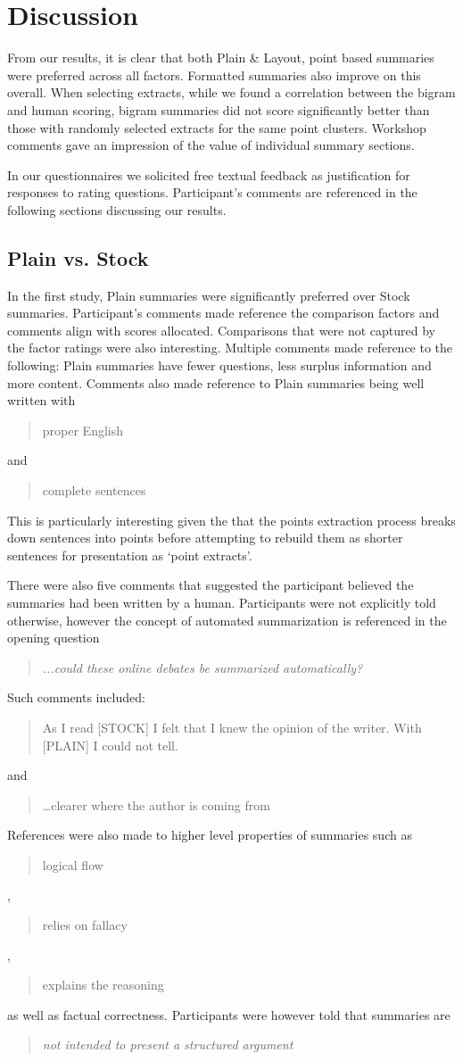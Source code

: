   \section{Discussion}
    From our results, it is clear that both Plain \& Layout, point based summaries were preferred across all factors. Formatted summaries also improve on this overall. When selecting extracts, while we found a correlation between the bigram and human scoring, bigram summaries did not score significantly better than those with randomly selected extracts for the same point clusters. Workshop comments gave an impression of the value of individual summary sections.

    In our questionnaires we solicited free textual feedback as justification for responses to rating questions. Participant's comments are referenced in the following sections discussing our results.

    \tocless\subsection{Plain vs. Stock}
      In the first study, Plain summaries were significantly preferred over Stock summaries. Participant's comments made reference the comparison factors and comments align with scores allocated. Comparisons that were not captured by the factor ratings were also interesting. Multiple comments made reference to the following: Plain summaries have fewer questions, less surplus information and more content. Comments also made reference to Plain summaries being well written with \blockquote{proper English} and \blockquote{complete sentences}. This is particularly interesting given the that the points extraction process breaks down sentences into points before attempting to rebuild them as shorter sentences for presentation as `point extracts'.

      There were also five comments that suggested the participant believed the summaries had been written by a human. Participants were not explicitly told otherwise, however the concept of automated summarization is referenced in the opening question \blockquote{\textit{...could these online debates be summarized automatically?}}. Such comments included: \blockquote{As I read [STOCK] I felt that I knew the opinion of the writer. With [PLAIN] I could not tell.} and \blockquote{\dots clearer where the author is coming from}. References were also made to higher level properties of summaries such as \blockquote{logical flow}, \blockquote{relies on fallacy}, \blockquote{explains the reasoning} as well as factual correctness. Participants were however told that summaries are \blockquote{\textit{not intended to present a structured argument}}.

